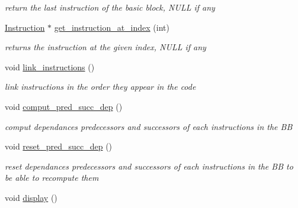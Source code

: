 \begin{DoxyCompactItemize}
\begin{DoxyCompactList}\small\item\em return the last instruction of the basic block, N\+U\+L\+L if any \end{DoxyCompactList}\item 
\hypertarget{class_basic__block_a84aa42e38e2494c2f8ab0a159dba3ca8}{\hyperlink{class_instruction}{Instruction} $\ast$ \hyperlink{class_basic__block_a84aa42e38e2494c2f8ab0a159dba3ca8}{get\+\_\+instruction\+\_\+at\+\_\+index} (int)}\label{class_basic__block_a84aa42e38e2494c2f8ab0a159dba3ca8}

\begin{DoxyCompactList}\small\item\em returns the instruction at the given index, N\+U\+L\+L if any \end{DoxyCompactList}\item 
\hypertarget{class_basic__block_ae53d18eb1436d162ee9ae565c46b35e5}{void \hyperlink{class_basic__block_ae53d18eb1436d162ee9ae565c46b35e5}{link\+\_\+instructions} ()}\label{class_basic__block_ae53d18eb1436d162ee9ae565c46b35e5}

\begin{DoxyCompactList}\small\item\em link instructions in the order they appear in the code \end{DoxyCompactList}\item 
\hypertarget{class_basic__block_a2f2cdedde41f78b7982e6d6d348524c2}{void \hyperlink{class_basic__block_a2f2cdedde41f78b7982e6d6d348524c2}{comput\+\_\+pred\+\_\+succ\+\_\+dep} ()}\label{class_basic__block_a2f2cdedde41f78b7982e6d6d348524c2}

\begin{DoxyCompactList}\small\item\em comput dependances predecessors and successors of each instructions in the B\+B \end{DoxyCompactList}\item 
\hypertarget{class_basic__block_a4ef46cdfb1fa30e3edfc0407b008fa08}{void \hyperlink{class_basic__block_a4ef46cdfb1fa30e3edfc0407b008fa08}{reset\+\_\+pred\+\_\+succ\+\_\+dep} ()}\label{class_basic__block_a4ef46cdfb1fa30e3edfc0407b008fa08}

\begin{DoxyCompactList}\small\item\em reset dependances predecessors and successors of each instructions in the B\+B to be able to recompute them \end{DoxyCompactList}\item 
\hypertarget{class_basic__block_aad79779b098ba4ccd1549a8dbbd80d7d}{void \hyperlink{class_basic__block_aad79779b098ba4ccd1549a8dbbd80d7d}{display} ()}\label{class_basic__block_aad79779b098ba4ccd1549a8dbbd80d7d}


\end{DoxyCompactItemize}
